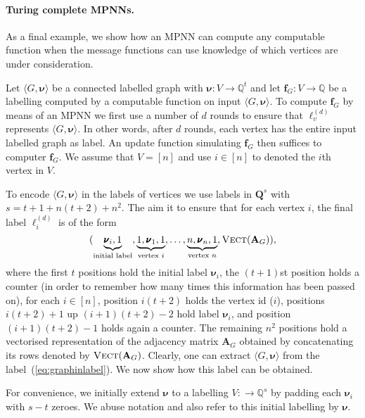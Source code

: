 \paragraph{Turing complete MPNNs.}
 As a final example, we show how an MPNN can compute any computable function when the message functions can use knowledge of which vertices are under consideration. 

\begin{example}\normalfont
	Let $\langle G,\pmb{\nu}\rangle$ be a connected labelled graph with $\pmb{\nu}:V\to\mathbb{Q}^t$ and let $\mathbf{f}_G:V\to\mathbb{Q}$ be a labelling 
	computed by a computable function on input 	$\langle G,\pmb{\nu}\rangle$. To compute $\mathbf{f}_G$ by means of an MPNN we first use a number  of $d$ rounds  to ensure that $\pmb{\ell}^{(d)}_v$ represents $\langle G,\pmb{\nu}\rangle$. In other words, after $d$ rounds,  each vertex has the entire input labelled graph as label. An update function simulating $\mathbf{f}_G$ then suffices to computer $\mathbf{f}_G$. We assume that $V=[n]$ and use $i\in[n]$ to denoted the $i$th vertex in $V$.
	
To encode $\langle G,\pmb{\nu}\rangle$ in the labels of vertices we use labels in $\mathbf{Q}^s$ with 
$s=t+1+n(t+2)+n^2$. The aim it to ensure that for each vertex $i$, the final label $\pmb{\ell}_i^{(d)}$ is of the form
\begin{equation}
(\underbrace{\vphantom{f}\pmb{\nu}_i,1}_{\text{initial label}},\underbrace{\vphantom{f}1,\pmb{\nu}_1,1}_{\text{vertex $i$}},\ldots,\underbrace{\vphantom{f}n,\pmb{\nu}_n,1}_{\text{vertex $n$}},\textsc{Vect}(\mathbf{A}_G)), \label{eq:graphinlabel}
\end{equation}
where the first $t$ positions hold the initial label $\pmb{\nu}_i$,
the $(t+1)$st position holds a counter (in order to remember how many times
this information has been passed on), for each $i\in[n]$, position
$i(t+2)$ holds the vertex id ($i$), positions $i(t+2)+1$ up $(i+1)(t+2)-2$
hold label $\pmb{\nu}_i$, and position $(i+1)(t+2)-1$ holds again a counter.
The remaining $n^2$ positions hold a vectorised representation of the adjacency matrix $\mathbf{A}_G$ obtained by concatenating its rows denoted by $\textsc{Vect}(\mathbf{A}_G)$. Clearly, one can extract 
$\langle G,\pmb{\nu}\rangle$ from the label~(\ref{eq:graphinlabel}). We now show how this label can be obtained.

For convenience, we initially extend $\pmb{\nu}$
to a labelling $V:\to\mathbb{Q}^s$ by padding each $\pmb{\nu}_i$ with $s-t$ zeroes. We abuse notation and also refer to this initial labelling by $\pmb{\nu}$.


\end{example}
